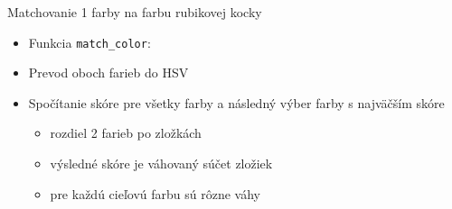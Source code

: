 \begin{frame}{Matchovanie 1 farby na farbu rubikovej kocky}
\begin{itemize}
\begin{textblock*}{4.5cm}(8.0cm,5.5cm)
\end{textblock*}
\item<1->Funkcia {\tt match\_color}:
\item<2->Prevod oboch farieb do HSV
\item<3->Spočítanie skóre pre všetky farby a následný výber farby s najväčším skóre
    \begin{itemize}
    \item<4-> rozdiel 2 farieb po zložkách   
    \item<5-> výsledné skóre je váhovaný súčet zložiek
    \item<6-> pre každú cieľovú farbu sú rôzne váhy
    \end{itemize}
\end{itemize}
\end{frame}


